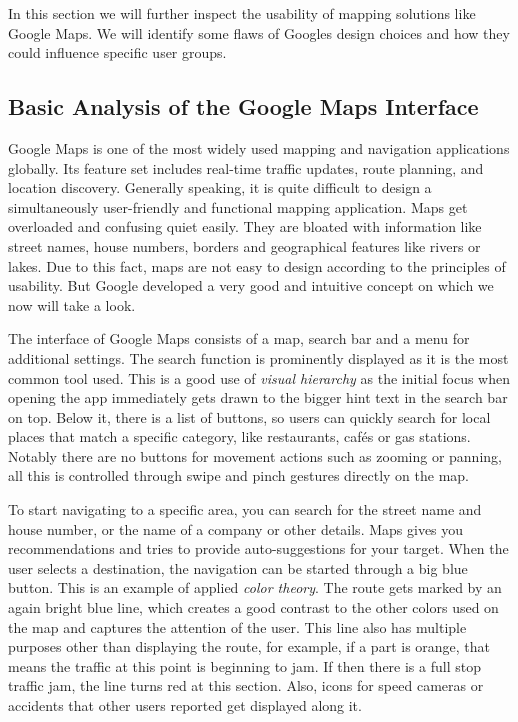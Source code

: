 \Author{\daAuthorTwo}

In this section we will further inspect the usability of mapping solutions like Google Maps. We will identify some flaws of Googles design choices and how they could influence specific user groups.

\blankLine

\subsection{Basic Analysis of the Google Maps Interface}

Google Maps is one of the most widely used mapping and navigation applications globally. Its feature set includes real-time traffic updates, route planning, and location discovery. Generally speaking, it is quite difficult to design a simultaneously user-friendly and functional mapping application. Maps get overloaded and confusing quiet easily. They are bloated with information like street names, house numbers, borders and geographical features like rivers or lakes. Due to this fact, maps are not easy to design according to the principles of usability. But Google developed a very good and intuitive concept on which we now will take a look.

\blankLine

The interface of Google Maps consists of a map, search bar and a menu for additional settings. The search function is prominently displayed as it is the most common tool used. This is a good use of \textit{visual hierarchy} as the initial focus when opening the app immediately gets drawn to the bigger hint text in the search bar on top. Below it, there is a list of buttons, so users can quickly search for local places that match a specific category, like restaurants, cafés or gas stations. Notably there are no buttons for movement actions such as zooming or panning, all this is controlled through swipe and pinch gestures directly on the map. 

\blankLine

To start navigating to a specific area, you can search for the street name and house number, or the name of a company or other details. Maps gives you recommendations and tries to provide auto-suggestions for your target. When the user selects a destination, the navigation can be started through a big blue button. This is an example of applied \textit{color theory}. The route gets marked by an again bright blue line, which creates a good contrast to the other colors used on the map and captures the attention of the user. This line also has multiple purposes other than displaying the route, for example, if a part is orange, that means the traffic at this point is beginning to jam. If then there is a full stop traffic jam, the line turns red at this section. Also, icons for speed cameras or accidents that other users reported get displayed along it.

